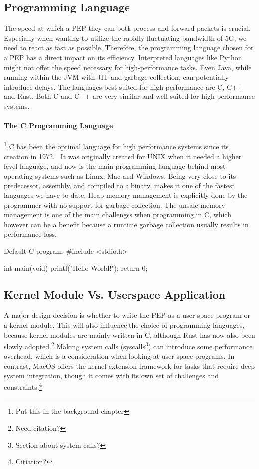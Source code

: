 \documentclass[a4paper,english, 11pt]{report}
\begin{document}
\subsection{Programming Language}
The speed at which a PEP they can both process and forward packets is crucial. Especially when wanting to utilize the rapidly fluctuating bandwidth of 5G, we need to react as fast as possible. Therefore, the programming language chosen for a PEP has a direct impact on its efficiency. Interpreted languages like Python might not offer the speed necessary for high-performance tasks. Even Java, while running within the JVM with JIT and garbage collection, can potentially introduce delays. The languages best suited for high performance are C, C++ and Rust. Both C and C++ are very similar and well suited for high performance systems.

\paragraph{The C Programming Language}\footnote{Put this in the background chapter}
C has been the optimal language for high performance systems since its creation in 1972.~\cite{c_programming_language} It was originally created for UNIX when it needed a higher level language, and now is the main programming language behind most operating systems such as Linux, Mac and Windows. Being very close to its predecessor, assembly, and compiled to a binary, makes it one of the fastest languages we have to date. Heap memory management is explicitly done by the programmer with no support for garbage collection. The unsafe memory management is one of the main challenges when programming in C, which however can be a benefit because a runtime garbage collection usually results in performance loss.

\begin{autonumlstlisting}[label=lst:hello_world]{Default C program.}
#include <stdio.h>

int main(void)
{
	printf("Hello World!");
	return 0;
}

\end{autonumlstlisting}

\subsection{Kernel Module Vs. Userspace Application}
A major design decision is whether to write the PEP as a user-space program or a kernel module. This will also influence the choice of programming languages, because kernel modules are mainly written in C, although Rust has now also been slowly adopted.\footnote{Need citation?} Making system calls (syscalls\footnote{Section about system calls?}) can introduce some performance overhead, which is a consideration when looking at user-space programs. In contrast, MacOS offers the kernel extension framework for tasks that require deep system integration, though it comes with its own set of challenges and constraints.\footnote{Citiation?}\\
\end{document}
